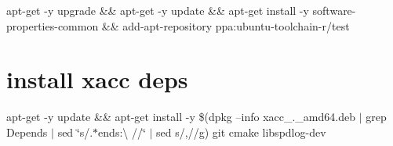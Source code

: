 apt-\/get -\/y upgrade \&\& apt-\/get -\/y update \&\& apt-\/get install -\/y software-\/properties-\/common \&\& add-\/apt-\/repository ppa\+:ubuntu-\/toolchain-\/r/test \section*{install xacc deps}

apt-\/get -\/y update \&\& apt-\/get install -\/y \$(dpkg --info xacc\+\_.\+\_\+amd64.\+deb $\vert$ grep Depends $\vert$ sed \char`\"{}s/.$\ast$ends\+:\textbackslash{} //\char`\"{} $\vert$ sed \textquotesingle{}s/,//g\textquotesingle{}) git cmake libspdlog-\/dev 